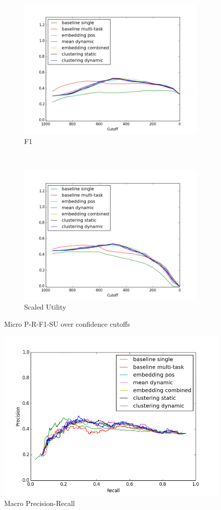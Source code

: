 \documentclass{article}
\begin{document}
\begin{figure}[tb]
\begin{subfigure}[b]{\officialRunWidth}
            \includegraphics[width=\textwidth]{fig/microF1}
      \caption{F1}
      \label{official:microf1}
    \end{subfigure}
    ~
    \begin{subfigure}[b]{\officialRunWidth}
            \includegraphics[width=\textwidth]{fig/microSU}
      \caption{Scaled Utility}
      \label{official:microsu}
    \end{subfigure}
\caption{Micro P-R-F1-SU over confidence cutoffs}
\label{microRuns}
\end{figure}

\begin{figure}[tb]
\centering
\includegraphics[width=.5\textwidth]{fig/macroPrecisionRecall.png}
\caption{Macro Precision-Recall}
\label{macroPrecRecall}
\end{figure}
\end{document}
